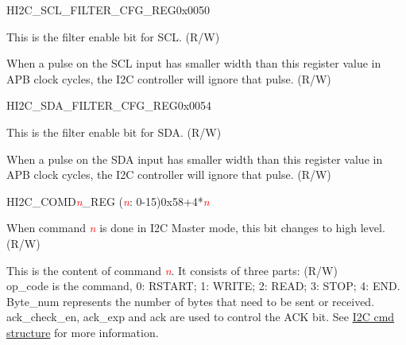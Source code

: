 \documentclass[main.tex]{subfiles}
\begin{document}
\begin{register}{H}{I2C\_SCL\_FILTER\_CFG\_REG}{0x0050}\label{regdesc:I2CSCLFILTERCFGREG}
%
%
%
\regnewline%
\begin{regdesc}\begin{reglist}
\item [I2C\_SCL\_FILTER\_EN]This is the filter enable bit for SCL. (R/W)
\item [I2C\_SCL\_FILTER\_THRES]When a pulse on the SCL input has smaller width than this register value in APB clock cycles, the I2C controller will ignore that pulse. (R/W)
\end{reglist}\end{regdesc}
\end{register}


\begin{register}{H}{I2C\_SDA\_FILTER\_CFG\_REG}{0x0054}\label{regdesc:I2CSDAFILTERCFGREG}
%
%
%
\regnewline%
\begin{regdesc}\begin{reglist}
\item [I2C\_SDA\_FILTER\_EN]This is the filter enable bit for SDA. (R/W)
\item [I2C\_SDA\_FILTER\_THRES]When a pulse on the SDA input has smaller width than this register value in APB clock cycles, the I2C controller will ignore that pulse. (R/W)
\end{reglist}\end{regdesc}
\end{register}


\begin{register}{H}{I2C\_COMD\textcolor{red}{\it{n}}\_REG (\textcolor{red}{\it{n}}: 0-15)}{0x58+4*\textcolor{red}{\it{n}}}\label{regdesc:I2CCOMDnREG}
%
%
%
\regnewline%
\begin{regdesc}\begin{reglist}
\item [I2C\_COMMAND\textcolor{red}{\it{n}}\_DONE]When command \textcolor{red}{\it{n}} is done in I2C Master mode, this bit changes to high level. (R/W)
\item [I2C\_COMMAND\textcolor{red}{\it{n}}]This is the content of command \textcolor{red}{\it{n}}. It consists of three parts: (R/W) \\op\_code is the command, 0: RSTART; 1: WRITE; 2: READ;  3: STOP; 4: END.\\  Byte\_num represents the number of bytes that need to be sent or received. \\ack\_check\_en, ack\_exp and ack are used to control the ACK bit. See \hyperref[para:i2ccmd]{I2C cmd structure} for more information.
\end{reglist}\end{regdesc}
\end{register}
\end{document}
